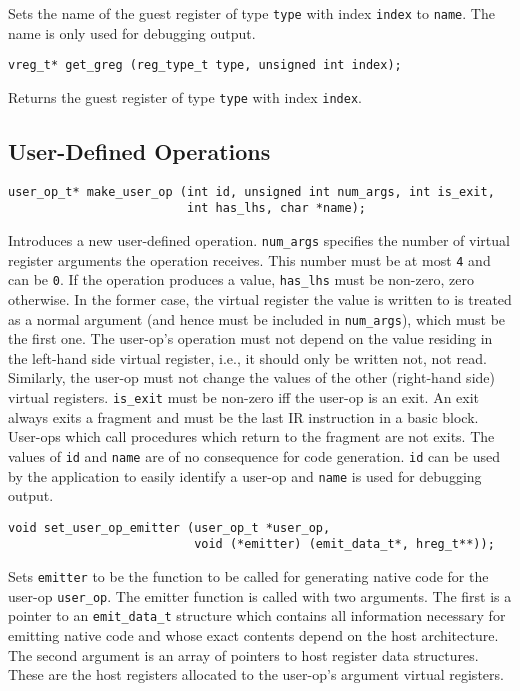 \documentclass{article}
\newcommand{\cc}[1]{\texttt{#1}} %
\begin{document}
Sets the name of the guest register of type \cc{type} with index
\cc{index} to \cc{name}.  The name is only used for debugging output.

\begin{verbatim}
vreg_t* get_greg (reg_type_t type, unsigned int index);
\end{verbatim}

Returns the guest register of type \cc{type} with index \cc{index}.

\subsection{User-Defined Operations}

\begin{verbatim}
user_op_t* make_user_op (int id, unsigned int num_args, int is_exit,
                         int has_lhs, char *name);
\end{verbatim}

Introduces a new user-defined operation.  \cc{num\_args} specifies the
number of virtual register arguments the operation receives.  This
number must be at most \cc{4} and can be \cc{0}.  If the operation
produces a value, \cc{has\_lhs} must be non-zero, zero otherwise.  In
the former case, the virtual register the value is written to is
treated as a normal argument (and hence must be included in
\cc{num\_args}), which must be the first one.  The user-op's operation
must not depend on the value residing in the left-hand side virtual
register, i.e., it should only be written not, not read.  Similarly,
the user-op must not change the values of the other (right-hand side)
virtual registers.  \cc{is\_exit} must be non-zero iff the user-op is
an exit.  An exit always exits a fragment and must be the last IR
instruction in a basic block.  User-ops which call procedures which
return to the fragment are not exits.  The values of \cc{id} and
\cc{name} are of no consequence for code generation.  \cc{id} can be
used by the application to easily identify a user-op and \cc{name} is
used for debugging output.

\begin{verbatim}
void set_user_op_emitter (user_op_t *user_op,
                          void (*emitter) (emit_data_t*, hreg_t**));
\end{verbatim}

Sets \cc{emitter} to be the function to be called for generating
native code for the user-op \cc{user\_op}.  The emitter function is
called with two arguments.  The first is a pointer to an
\cc{emit\_data\_t} structure which contains all information necessary
for emitting native code and whose exact contents depend on the host
architecture.
The second argument is an array of pointers to host register data
structures.  These are the host registers allocated to the user-op's
argument virtual registers.
\end{document}
